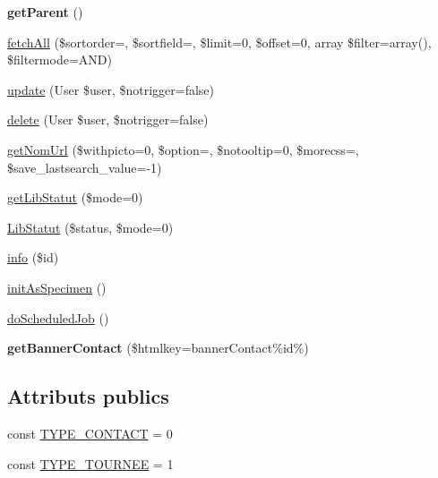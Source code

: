 \begin{DoxyCompactItemize}
\item 
\mbox{\label{classTourneeGeneric__lines__contacts_a09cd3063ff28aabd22e3ef716e4e1c60}} 
{\bfseries get\+Parent} ()
\item 
\hyperlink{classTourneeGeneric__lines__contacts_ab3c5519a2a6e58620d8b0cbbfbd70a16}{fetch\+All} (\$sortorder=\textquotesingle{}\textquotesingle{}, \$sortfield=\textquotesingle{}\textquotesingle{}, \$limit=0, \$offset=0, array \$filter=array(), \$filtermode=\textquotesingle{}A\+ND\textquotesingle{})
\item 
\hyperlink{classTourneeGeneric__lines__contacts_a97703a7bf8dd3ee92cc2a9fc84c80451}{update} (User \$user, \$notrigger=false)
\item 
\hyperlink{classTourneeGeneric__lines__contacts_a5fdfed36da55fa22ebdc8a3841235cc6}{delete} (User \$user, \$notrigger=false)
\item 
\hyperlink{classTourneeGeneric__lines__contacts_a5f7956b40b693780735e4874cda9c927}{get\+Nom\+Url} (\$withpicto=0, \$option=\textquotesingle{}\textquotesingle{}, \$notooltip=0, \$morecss=\textquotesingle{}\textquotesingle{}, \$save\+\_\+lastsearch\+\_\+value=-\/1)
\item 
\hyperlink{classTourneeGeneric__lines__contacts_aaa7c1a5e3aafba3dc24dfb0f976a80f4}{get\+Lib\+Statut} (\$mode=0)
\item 
\hyperlink{classTourneeGeneric__lines__contacts_a10c4f2ff5bca7b526ac685492a5f719f}{Lib\+Statut} (\$status, \$mode=0)
\item 
\hyperlink{classTourneeGeneric__lines__contacts_a3be3a6541c7213b95282d97ca33deb39}{info} (\$id)
\item 
\hyperlink{classTourneeGeneric__lines__contacts_a487f8894bebdae9f5ed29478320ebfef}{init\+As\+Specimen} ()
\item 
\hyperlink{classTourneeGeneric__lines__contacts_a8321cf8fe4c73c68569c42f7425c0f57}{do\+Scheduled\+Job} ()
\item 
\mbox{\label{classTourneeGeneric__lines__contacts_aa05ba227e2877927d09ee2fb93c6a929}} 
{\bfseries get\+Banner\+Contact} (\$htmlkey=\textquotesingle{}banner\+Contact\%id\%\textquotesingle{})
\end{DoxyCompactItemize}
\subsection*{Attributs publics}
\begin{DoxyCompactItemize}
\item 
const \hyperlink{classTourneeGeneric__lines__contacts_a64332d4a3c4b4d848246e10df825c516}{T\+Y\+P\+E\+\_\+\+C\+O\+N\+T\+A\+CT} = 0
\item 
const \hyperlink{classTourneeGeneric__lines__contacts_a7d515f55057e1057cf59f58be806d895}{T\+Y\+P\+E\+\_\+\+T\+O\+U\+R\+N\+EE} = 1
\end{DoxyCompactItemize}


